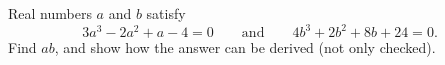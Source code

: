 Real numbers $a$ and $b$ satisfy
\[
3a^3-2a^2+a-4=0\qquad\text{and}\qquad 4b^3+2b^2+8b+24=0 .
\]
Find $ab$, and show how the answer can be derived (not only checked).
